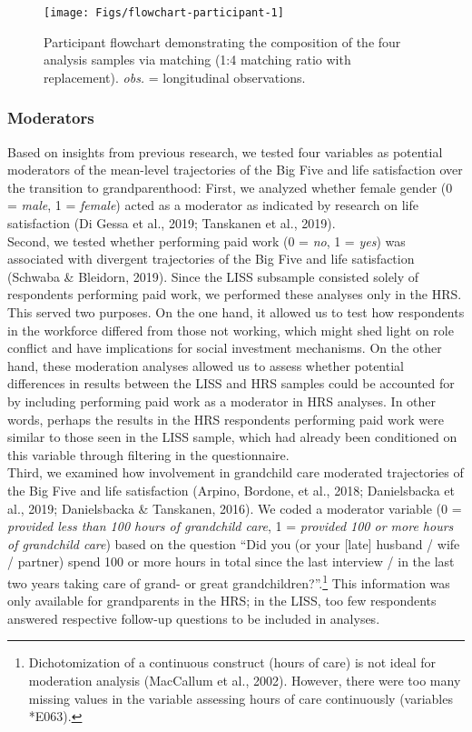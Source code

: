 \documentclass[
  english,
  man,floatsintext]{apa7}
\begin{document}
\begin{figure}

{\centering \texttt{[image: Figs/flowchart-participant-1]} 

}

\caption{Participant flowchart demonstrating the composition of the four analysis samples via matching (1:4 matching ratio with replacement). \emph{obs.} = longitudinal observations.}\label{fig:flowchart-participant}
\end{figure}

\hypertarget{moderators}{%
\subsubsection{Moderators}\label{moderators}}

Based on insights from previous research, we tested four variables as potential moderators of the mean-level trajectories of the Big Five and life satisfaction over the transition to grandparenthood: First, we analyzed whether female gender (0 = \emph{male}, 1 = \emph{female}) acted as a moderator as indicated by research on life satisfaction (Di Gessa et al., 2019; Tanskanen et al., 2019).\\
Second, we tested whether performing paid work (0 = \emph{no}, 1 = \emph{yes}) was associated with divergent trajectories of the Big Five and life satisfaction (Schwaba \& Bleidorn, 2019). Since the LISS subsample consisted solely of respondents performing paid work, we performed these analyses only in the HRS. This served two purposes. On the one hand, it allowed us to test how respondents in the workforce differed from those not working, which might shed light on role conflict and have implications for social investment mechanisms. On the other hand, these moderation analyses allowed us to assess whether potential differences in results between the LISS and HRS samples could be accounted for by including performing paid work as a moderator in HRS analyses. In other words, perhaps the results in the HRS respondents performing paid work were similar to those seen in the LISS sample, which had already been conditioned on this variable through filtering in the questionnaire.\\
Third, we examined how involvement in grandchild care moderated trajectories of the Big Five and life satisfaction (Arpino, Bordone, et al., 2018; Danielsbacka et al., 2019; Danielsbacka \& Tanskanen, 2016). We coded a moderator variable (0 = \emph{provided less than 100 hours of grandchild care}, 1 = \emph{provided 100 or more hours of grandchild care}) based on the question \enquote{Did you (or your {[}late{]} husband / wife / partner) spend 100 or more hours in total since the last interview / in the last two years taking care of grand- or great grandchildren?}.\footnote{Dichotomization of a continuous construct (hours of care) is not ideal for moderation analysis (MacCallum et al., 2002). However, there were too many missing values in the variable assessing hours of care continuously (variables *E063).} This information was only available for grandparents in the HRS; in the LISS, too few respondents answered respective follow-up questions to be included in analyses.\\
\end{document}
